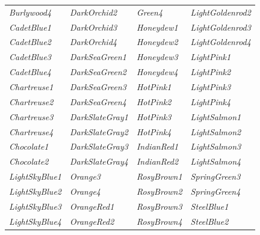 \documentclass{article}
\newcommand\myfcolorbox[1]{\fcolorbox{black}{#1}{\phantom{\tiny{color}}} \textit{#1}\quad}
\begin{document}
\begin{center}
\begin{tabular}{llll}
			\myfcolorbox{Burlywood4} & \myfcolorbox{DarkOrchid2} & \myfcolorbox{Green4} & \myfcolorbox{LightGoldenrod2} \\
			
			\myfcolorbox{CadetBlue1} & \myfcolorbox{DarkOrchid3} & \myfcolorbox{Honeydew1} & \myfcolorbox{LightGoldenrod3} \\
			
			\myfcolorbox{CadetBlue2} & \myfcolorbox{DarkOrchid4} & \myfcolorbox{Honeydew2} & \myfcolorbox{LightGoldenrod4} \\
			
			\myfcolorbox{CadetBlue3} & \myfcolorbox{DarkSeaGreen1} & \myfcolorbox{Honeydew3} & \myfcolorbox{LightPink1} \\
			
			\myfcolorbox{CadetBlue4} & \myfcolorbox{DarkSeaGreen2} & \myfcolorbox{Honeydew4} & \myfcolorbox{LightPink2} \\
			
			\myfcolorbox{Chartreuse1} & \myfcolorbox{DarkSeaGreen3} & \myfcolorbox{HotPink1} & \myfcolorbox{LightPink3} \\
			
			\myfcolorbox{Chartreuse2} & \myfcolorbox{DarkSeaGreen4} & \myfcolorbox{HotPink2} & \myfcolorbox{LightPink4} \\
			
			\myfcolorbox{Chartreuse3} & \myfcolorbox{DarkSlateGray1} & \myfcolorbox{HotPink3} & \myfcolorbox{LightSalmon1} \\
			
			\myfcolorbox{Chartreuse4} & \myfcolorbox{DarkSlateGray2} & \myfcolorbox{HotPink4} & \myfcolorbox{LightSalmon2} \\
			
			\myfcolorbox{Chocolate1} & \myfcolorbox{DarkSlateGray3} & \myfcolorbox{IndianRed1} & \myfcolorbox{LightSalmon3} \\
			
			\myfcolorbox{Chocolate2} & \myfcolorbox{DarkSlateGray4} & \myfcolorbox{IndianRed2} & \myfcolorbox{LightSalmon4} \\
			
			\myfcolorbox{LightSkyBlue1} & \myfcolorbox{Orange3} & \myfcolorbox{RosyBrown1} & \myfcolorbox{SpringGreen3} \\
			
			\myfcolorbox{LightSkyBlue2} & \myfcolorbox{Orange4} & \myfcolorbox{RosyBrown2} & \myfcolorbox{SpringGreen4} \\
			
			\myfcolorbox{LightSkyBlue3} & \myfcolorbox{OrangeRed1} & \myfcolorbox{RosyBrown3} & \myfcolorbox{SteelBlue1} \\
			
			\myfcolorbox{LightSkyBlue4} & \myfcolorbox{OrangeRed2} & \myfcolorbox{RosyBrown4} & \myfcolorbox{SteelBlue2} \\
		\end{tabular}
	\end{center}
\end{document}
